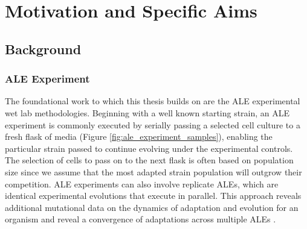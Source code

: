 \documentclass[12pt,final,masters,chapterheads]{ucsd}  %
\begin{document}
\chapter{Motivation and Specific Aims}

%
%
%
%

%
%

%
%

\section{Background}
\subsection{ALE Experiment}

%
%

%
%

The foundational work to which this thesis builds on are the ALE experimental wet lab methodologies. Beginning with a well known starting strain, an ALE experiment is commonly executed by serially passing a selected cell culture to a fresh flask of media (Figure \ref{fig:ale_experiment_samples}), enabling the particular strain passed to continue evolving under the experimental controls. The selection of cells to pass on to the next flask is often based on population size since we assume that the most adapted strain population will outgrow their competition. ALE experiments can also involve replicate ALEs, which are identical experimental evolutions that execute in parallel. This approach reveals additional mutational data on the dynamics of adaptation and evolution for an organism and reveal a convergence of adaptations across multiple ALEs \cite{sys_bio_book}.
\end{document}
